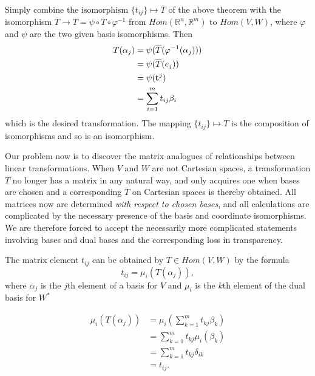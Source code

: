 \documentclass[12pt,letterpaper,reqno]{article}
\numberwithin{equation}{section}
\newcommand{\ti}[1]{\textit{#1}}
\begin{document}
\begin{pf}
Simply combine the isomorphism $\{t_{ij}\} \mapsto \overline{T}$ of the above theorem with the isomorphism $\overline{T} \to T = \psi \circ \overline{T} \circ \varphi^{-1}$ from $Hom(\mathbb{R}^n,\mathbb{R}^m)$ to $Hom(V,W)$, where $\varphi$ and $\psi$ are the two given basis isomorphisms. Then
\begin{align*}
	T(\alpha_j)&=\psi(\overline{T}(\varphi^{-1}(\alpha_j))) \\
	&=\psi(\overline{T}(e_j)) \\
	&=\psi({\bf t}^j) \\
	&=\sum_{i=1}^m t_{ij}\beta_i
\end{align*}
which is the desired transformation. The mapping $\{t_{ij}\} \mapsto T$ is the composition of isomorphisms and so is an isomorphism.
\end{pf}

Our problem now is to discover the matrix analogues of relationships between linear transformations. When $V$ and $W$ are not Cartesian spaces, a transformation $T$ no longer has a matrix in any natural way, and only acquires one when bases are chosen and a corresponding $\overline{T}$ on Cartesian spaces is thereby obtained. All matrices now are determined \ti{with respect to chosen bases}, and all calculations are complicated by the necessary presence of the basis and coordinate isomorphisms. We are therefore forced to accept the necessarily more complicated statements involving bases and dual bases and the corresponding loss in transparency.

\begin{thm}\label{thm:matrix_elts_of_t_in_hom_v_w}
	The matrix element $t_{ij}$ can be obtained by $T \in Hom(V,W)$ by the formula
	\begin{equation}
		t_{ij}=\mu_i(T(\alpha_j)),
	\end{equation}
	where $\alpha_j$ is the $j$th element of a basis for $V$ and $\mu_i$ is the $k$th element of the dual basis for $W^*$
\end{thm}

\begin{pf}
\begin{align*}
	\mu_i(T(\alpha_j))&=\mu_i(\sum_{k=1}^mt_{kj}\beta_k) \\
	&=\sum_{k=1}^mt_{kj}\mu_i(\beta_k) \\
	&=\sum_{k=1}^mt_{kj}\delta_{ik} \\
	&=t_{ij}.
\end{align*}	
\end{pf}
\end{document}
